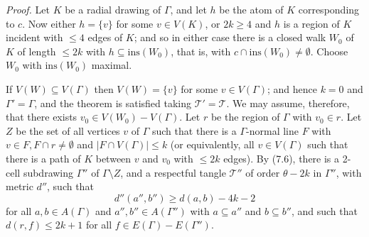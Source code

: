 \textit{Proof.} Let $K$ be a radial drawing of $\Gamma$, and let $h$ be the atom of $K$ corresponding to $c$. Now either $h = \{v\}$ for some $v \in V(K)$, or $2k \ge 4$ and $h$ is a region of $K$ incident with $\le 4$ edges of $K$; and so in either case there is a closed walk $W_0$ of $K$ of length $\le 2k$ with $h \subseteq \text{ins}(W_0)$, that is, with $c \cap \text{ins}(W_0) \ne \emptyset$. Choose $W_0$ with $\text{ins}(W_0)$ maximal.

If $V(W) \subseteq V(\Gamma)$ then $V(W) = \{v\}$ for some $v \in V(\Gamma)$; and hence $k = 0$ and $\Gamma' = \Gamma$, and the theorem is satisfied taking $\mathscr{T}' = \mathscr{T}$. We may assume, therefore, that there exists $v_0 \in V(W_0) - V(\Gamma)$. Let $r$ be the region of $\Gamma$ with $v_0 \in r$. Let $Z$ be the set of all vertices $v$ of $\Gamma$ such that there is a $\Gamma$-normal line $F$ with $v \in F, F \cap r \ne \emptyset$ and $|F \cap V(\Gamma)| \le k$ (or equivalently, all $v \in V(\Gamma)$ such that there is a path of $K$ between $v$ and $v_0$ with $\le 2k$ edges). By (7.6), there is a 2-cell subdrawing $\Gamma''$ of $\Gamma \setminus Z$, and a respectful tangle $\mathscr{T}''$ of order $\theta - 2k$ in $\Gamma''$, with metric $d''$, such that
\begin{equation*}
d''(a'', b'') \ge d(a, b) - 4k - 2
\end{equation*}
for all $a, b \in A(\Gamma)$ and $a'', b'' \in A(\Gamma'')$ with $a \subseteq a''$ and $b \subseteq b''$, and such that $d(r, f) \le 2k + 1$ for all $f \in E(\Gamma) - E(\Gamma'')$.

